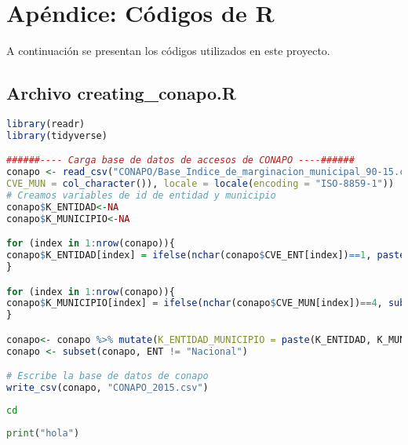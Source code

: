 \documentclass{article}
\title{}
\author{Cesar Zamora}
\theoremstyle{plain}
\begin{document}
\section*{Apéndice: Códigos de R}

A continuación se presentan los códigos utilizados en este proyecto.

\subsection*{Archivo creating\_conapo.R}

\begin{lstlisting}[language=R]
library(readr)
library(tidyverse)

######---- Carga base de datos de accesos de CONAPO ----######
conapo <- read_csv("CONAPO/Base_Indice_de_marginacion_municipal_90-15.csv", col_types = cols(CVE_ENT = col_character(), 
CVE_MUN = col_character()), locale = locale(encoding = "ISO-8859-1"))
# Creamos variables de id de entidad y municipio
conapo$K_ENTIDAD<-NA
conapo$K_MUNICIPIO<-NA

for (index in 1:nrow(conapo)){
conapo$K_ENTIDAD[index] = ifelse(nchar(conapo$CVE_ENT[index])==1, paste(0,conapo$CVE_ENT[index],sep=""),conapo$CVE_ENT[index])
}

for (index in 1:nrow(conapo)){
conapo$K_MUNICIPIO[index] = ifelse(nchar(conapo$CVE_MUN[index])==4, substr(conapo$CVE_MUN[index],2,4),substr(conapo$CVE_MUN[index],3,5))
}

conapo<- conapo %>% mutate(K_ENTIDAD_MUNICIPIO = paste(K_ENTIDAD, K_MUNICIPIO,sep="")) 
conapo <- subset(conapo, ENT != "Nacional")

# Escribe la base de datos de conapo
write_csv(conapo, "CONAPO_2015.csv")

\end{lstlisting}


\begin{lstlisting}[language=Bash]
 cd
\end{lstlisting}

\begin{lstlisting}[language=Python]
print("hola")
\end{lstlisting}
\end{document}

